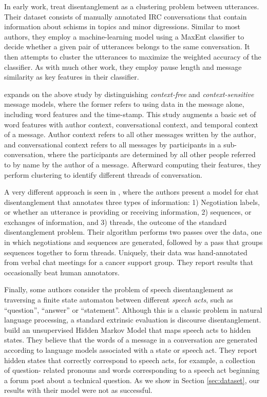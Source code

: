 \documentclass{article}
\begin{document}
In early work,  treat disentanglement as a clustering
problem between utterances. Their dataset consists of manually annotated IRC
conversations that contain information about schisms in topics and minor
digressions. Similar to most authors, they employ a machine-learning model
using a MaxEnt classifier to decide whether a given pair of utterances belongs
to the same conversation. It then attempts to cluster the utterances to
maximize the weighted accuracy of the classifier. As with much other work,
they employ pause length and message similarity as key features in their
classifier.

 expands on the above study by distinguishing
\textit{context-free} and \textit{context-sensitive} message models, where the 
former refers to using data in the message alone, including word features and the
time-stamp.  This study augments a basic set of word features with author context, 
conversational context, and temporal context of a message. Author context 
refers to all other messages written by the author, and conversational context 
refers to all messages by participants in a sub-conversation, 
where the participants are determined by all other people referred to by name 
by the author of a message.  Afterward computing their features, they perform
clustering to identify different threads of conversation.

A very different approach is seen in , where the authors present
a model for chat disentanglement that annotates three types of information: 1) 
Negotiation labels, or whether an utterance is providing or receiving 
information, 2) sequences, or exchanges of information, and 3) threads, the 
outcome of the standard disentanglement problem. Their algorithm performs 
two passes over the data,  one in which negotiations and sequences are generated, 
followed by a pass that groups sequences together to form threads. Uniquely,
their data was hand-annotated from verbal chat meetings for a cancer support group.
They report results that occasionally beat human annotators.

Finally, some authors consider the problem of speech disentanglement as
traversing a finite state automaton between different \textit{speech acts},
such as ``question'', ``answer'' or ``statement''. Although this is a classic
problem in natural language processing, a standard extrinsic evaluation is
discourse disentanglement.  build an unsupervised
Hidden Markov Model that  maps speech acts to hidden states. They believe that
the words of a message in a conversation are generated according to language
models associated with a state or speech act. They report hidden states that
correctly correspond to speech acts, for example, a collection of question-
related pronouns and words corresponding to a speech act beginning a forum
post about a technical question. As we show in Section \ref{sec:dataset}, our
results with their model were not as successful.
\end{document}
